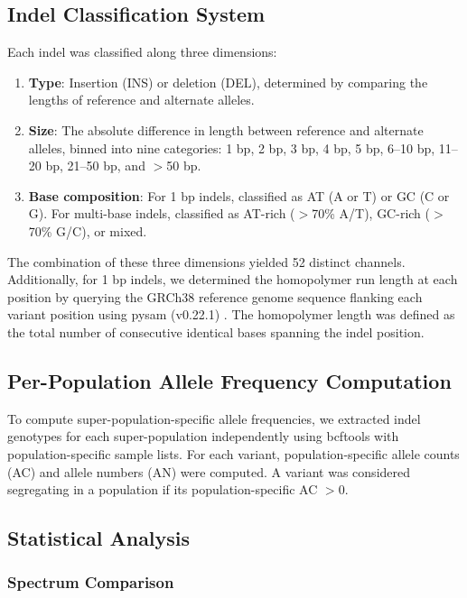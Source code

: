 \documentclass[11pt,a4paper]{article}
\begin{document}
\subsection{Indel Classification System}

Each indel was classified along three dimensions:

\begin{enumerate}
\item \textbf{Type}: Insertion (INS) or deletion (DEL), determined by comparing the lengths of reference and alternate alleles.
\item \textbf{Size}: The absolute difference in length between reference and alternate alleles, binned into nine categories: 1 bp, 2 bp, 3 bp, 4 bp, 5 bp, 6--10 bp, 11--20 bp, 21--50 bp, and $>$50 bp.
\item \textbf{Base composition}: For 1 bp indels, classified as AT (A or T) or GC (C or G). For multi-base indels, classified as AT-rich ($>$70\% A/T), GC-rich ($>$70\% G/C), or mixed.
\end{enumerate}

The combination of these three dimensions yielded 52 distinct channels. Additionally, for 1 bp indels, we determined the homopolymer run length at each position by querying the GRCh38 reference genome sequence flanking each variant position using pysam (v0.22.1) \citep{pysam}. The homopolymer length was defined as the total number of consecutive identical bases spanning the indel position.

\subsection{Per-Population Allele Frequency Computation}

To compute super-population-specific allele frequencies, we extracted indel genotypes for each super-population independently using bcftools with population-specific sample lists. For each variant, population-specific allele counts (AC) and allele numbers (AN) were computed. A variant was considered segregating in a population if its population-specific AC $> 0$.

\subsection{Statistical Analysis}

\subsubsection{Spectrum Comparison}
\end{document}
